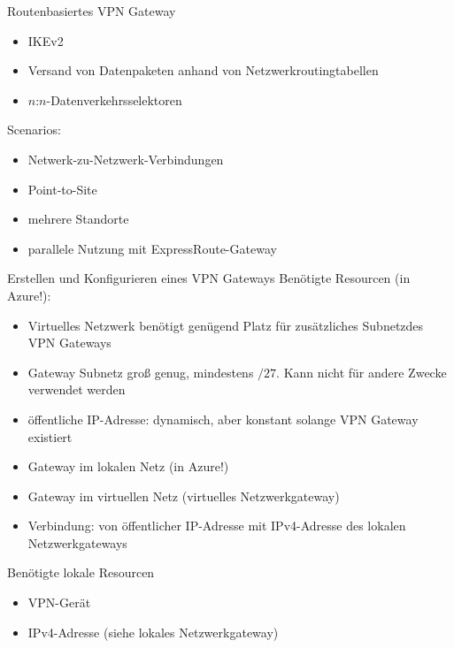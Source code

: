 \begin{flashcard}[Definition]{Routenbasiertes VPN Gateway}
    \begin{itemize}
        \item IKEv2
        \item Versand von Datenpaketen anhand von Netzwerkroutingtabellen
        \item $n$:$n$-Datenverkehrsselektoren
    \end{itemize}

    Scenarios:
    \begin{itemize}
        \item Netwerk-zu-Netzwerk-Verbindungen
        \item Point-to-Site
        \item mehrere Standorte
        \item parallele Nutzung mit ExpressRoute-Gateway
    \end{itemize}
\end{flashcard}

\begin{flashcard}[Definition]{Erstellen und Konfigurieren eines VPN Gateways}
    Benötigte Resourcen (in Azure!):
    \begin{itemize}
        \item Virtuelles Netzwerk\newline
            benötigt genügend Platz für zusätzliches Subnetzdes VPN Gateways
        \item Gateway Subnetz\newline
            groß genug, mindestens $/27$. Kann nicht für andere Zwecke verwendet werden
        \item öffentliche IP-Adresse: dynamisch, aber konstant solange VPN Gateway existiert
        \item Gateway im lokalen Netz (in Azure!)
        \item Gateway im virtuellen Netz (virtuelles Netzwerkgateway)
        \item Verbindung: von öffentlicher IP-Adresse mit IPv4-Adresse des lokalen Netzwerkgateways
    \end{itemize}

    Benötigte lokale Resourcen
    \begin{itemize}
        \item VPN-Gerät
        \item IPv4-Adresse (siehe lokales Netzwerkgateway)
    \end{itemize}
\end{flashcard}

